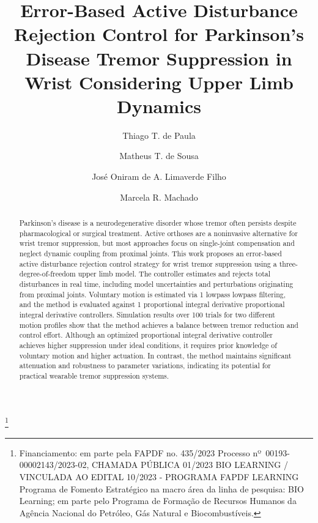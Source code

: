 \documentclass[a4paper]{ifacconf}
\newcommand{\reviewmode}{0}
\newcommand{\reviewchange}[2]{%
    \if\reviewmode1%
        \color{reviewcolor}
            #2
        \color{black}
    \else%
        #2
    \fi   
}
\begin{document}
\begin{frontmatter}
    \title{%
        Error-Based Active Disturbance Rejection Control for Parkinson's Disease Tremor Suppression in Wrist Considering Upper Limb Dynamics
    }  
    
    \thanks[footnoteinfo]{%
        Financiamento: em parte pela FAPDF no. 435/2023 Processo nº~00193-00002143/2023-02, CHAMADA PÚBLICA 01/2023 BIO LEARNING / VINCULADA AO EDITAL 10/2023 - PROGRAMA FAPDF LEARNING Programa de Fomento Estratégico na macro área da linha de pesquisa: BIO Learning; em parte pelo Programa de Formação de Recursos Humanos da Agência Nacional do Petróleo, Gás Natural e Biocombustíveis.
    }
    
    \author[First]{Thiago T. de Paula} 
    \author[Second]{Matheus T. de Sousa} 
    \author[Second]{Jos\'e Oniram de A. Limaverde Filho}
    \author[First]{Marcela R. Machado}
    
    \address[First]{%
        Department of Mechanical Engineering, University of Brasília, DF 
        (e-mails: thiagotomasdepaula@gmail.com; marcelam@unb.br).
    }
    \address[Second]{%
        Department of Electrical Engineering, University of Brasília, DF 
        (e-mails: matheus.sousa@ieee.org; jose.oniram@ene.unb.br).
    }
       
    \renewcommand{\abstractname}{{\bf Abstract:~}}   

    \begin{abstract} %
        Parkinson's disease is a neurodegenerative disorder whose tremor often persists despite pharmacological or surgical treatment. Active orthoses are a noninvasive alternative for wrist tremor suppression, but most approaches focus on single-joint compensation and neglect dynamic coupling from proximal joints. This work proposes an error-based active disturbance rejection control strategy for wrist tremor suppression using a three-degree-of-freedom upper limb model. The controller estimates and rejects total disturbances in real time, including model uncertainties and perturbations originating from proximal joints. Voluntary motion is estimated via \reviewchange{}{lowpass} filtering, and the method is evaluated against \reviewchange{}{proportional integral derivative} controllers. Simulation results over 100 trials for two different motion profiles show that 
        the method achieves a balance between tremor reduction and control effort. Although an optimized proportional integral derivative controller achieves higher suppression under ideal conditions, it requires prior knowledge of voluntary motion and higher actuation. In contrast, the method maintains significant attenuation and robustness to parameter variations, indicating its potential for practical wearable tremor suppression systems.
    \end{abstract}


\end{frontmatter}
\end{document}
